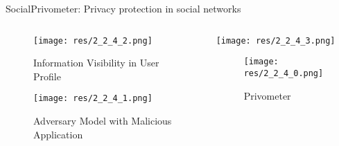 \begin{frame}{Social}{Privometer: Privacy protection in social networks \cite{talukder_privometer_2010}}

	\begin{columns}
		\begin{column}{0.5\textwidth}
			\begin{center}
				
				\begin{figure}
					\texttt{[image: res/2\_2\_4\_2.png]}
					\caption{\label{fig:2_2_4_3} Information Visibility in User Profile}

					\texttt{[image: res/2\_2\_4\_1.png]}
					\caption{\label{fig:2_2_4_1} Adversary Model with Malicious Application}
				\end{figure}
				
			\end{center}
		\end{column}
		
		\begin{column}{0.5\textwidth}
			
			\texttt{[image: res/2\_2\_4\_3.png]}
			
			\begin{figure}
				\texttt{[image: res/2\_2\_4\_0.png]}
				\caption{\label{fig:2_2_4_0} Privometer}
			\end{figure}
			
		\end{column}
	\end{columns}
	

\end{frame}

